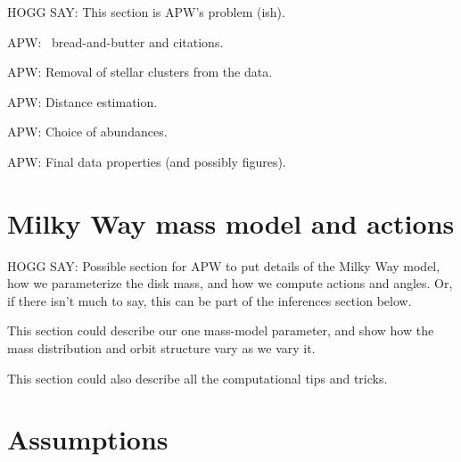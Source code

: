 \documentclass[modern]{aastex63}
\newcommand{\apogee}{\acronym{APOGEE}}
\begin{document}
HOGG SAY: This section is APW's problem (ish).

APW: \apogee\ bread-and-butter and citations.

APW: Removal of stellar clusters from the data.

APW: Distance estimation.

APW: Choice of abundances.

APW: Final data properties (and possibly figures).

\section{Milky Way mass model and actions}

HOGG SAY: Possible section for APW to put details of the Milky Way model,
how we parameterize the disk mass, and how we compute actions and angles.
Or, if there isn't much to say, this can be part of the inferences section
below.

This section could describe our one mass-model parameter, and show how
the mass distribution and orbit structure vary as we vary it.

This section could also describe all the computational tips and tricks.

\section{Assumptions}
\end{document}
